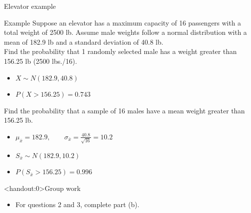 \documentclass[xcolor=table]{beamer}
\begin{document}
\begin{frame}{Elevator example}
\begin{exampleblock}{Example}
Suppose an elevator has a maximum capacity of 16 passengers with a total weight of 2500 lb. Assume male weights follow a normal distribution with a mean of 182.9 lb and a standard deviation of 40.8 lb. \\
\medskip
Find the probability that 1 randomly selected male has a weight greater than 156.25 lb (2500 lbs./16).
\begin{itemize}
\pause\item $X \sim N(182.9, 40.8)$
\pause\item $P( X > 156.25) = 0.743$
\end{itemize}
\pause\medskip
Find the probability that a sample of 16 males have a mean weight greater than 156.25 lb. 
\begin{itemize}
\pause\item $\mu_{\bar x} = 182.9, \qquad \sigma_{\bar x} = \frac {40.8}{\sqrt{16}} = 10.2$
\pause\item $S_{\bar x} \sim N(182.9, 10.2)$
\pause\item $P(S_{\bar x} > 156.25) = 0.996$
\end{itemize}
\end{exampleblock}
\end{frame}

\begin{frame}<handout:0>{Group work}
\begin{block}{}
\large
\begin{itemize}
\item For questions 2 and 3, complete part (b).
\end{itemize}
\end{block}
\end{frame}
\end{document}
